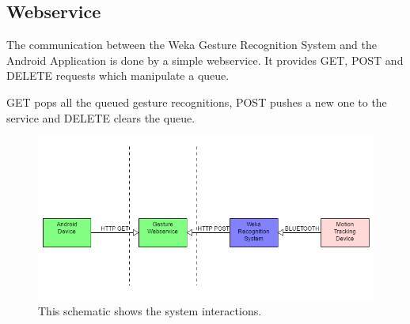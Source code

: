 \subsection{Webservice}
The communication between the Weka Gesture Recognition System and the Android Application is done by a simple webservice.
It provides GET, POST and DELETE requests which manipulate a queue.

GET pops all the queued gesture recognitions, 
POST pushes a new one to the service and DELETE clears the queue.

\begin{figure}[!h]
\centering
\includegraphics[width=0.9\columnwidth]{img/system_diagram}
\caption{This schematic shows the system interactions.}
\label{fig:sys}
\end{figure}